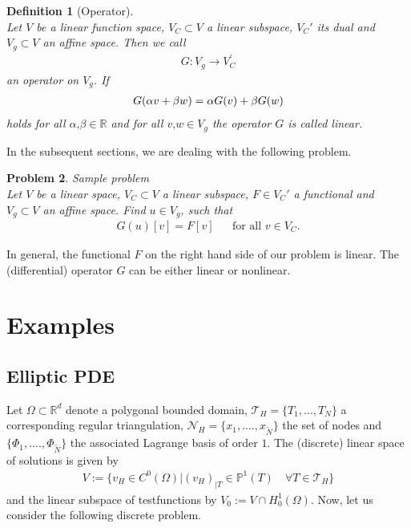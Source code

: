 \documentclass[a4paper,11pt]{article}
\numberwithin{equation}{section}
\newtheorem{definition}{Definition}[section]
\newtheorem{problem}[definition]{Problem}
\newcommand{\theoremNewline}{\hspace{1mm}\\}
\newcommand{\komma}{\text{,}}
\newcommand{\R}{\mathbb{R}}
\begin{document}
    \begin{definition}[Operator]\theoremNewline
      \label{definition::analytical_concept::operator}
      Let $V$ be a linear function space, ${V_C \subset V}$ a linear subspace, $V_C'$ its dual and ${V_g \subset V}$
      an affine space. Then we call
      \begin{align}
        G : V_g \rightarrow V^{\prime}_C
      \end{align}
      an \textnormal{operator} on $V_g$. If
      \begin{align}
        G(\alpha v + \beta w) = \alpha G(v) + \beta G(w)
          \notag
      \end{align}
      holds for all ${\alpha\komma \beta \in \R}$ and for all ${v\komma w \in V_g}$ the operator $G$ is called
      \textnormal{linear}.
    \end{definition}

    In the subsequent sections, we are dealing with the following problem.

    \begin{problem}{Sample problem}\theoremNewline
      \label{problem::analytical_concept::sample_problem}
      Let $V$ be a linear space, ${V_C \subset V}$ a linear subspace, ${F \in V_C'}$ a functional and
      ${V_g \subset V}$ an affine space. Find ${u \in V_g}$, such that
      \begin{align*}
        G(u)[v] = F[v] &&\text{for all } v \in V_C.
      \end{align*}
    \end{problem}

    In general, the functional $F$ on the right hand side of our problem is linear. The (differential) operator $G$
    can be either linear or nonlinear.

  \section{Examples}

    \subsection{Elliptic PDE}

      Let $\Omega \subset \mathbb{R}^d$ denote a polygonal bounded domain, $\mathcal{T}_H = \{ T_1, ..., T_N \}$ a
      corresponding regular triangulation, $\mathcal{N}_H = \{ x_1, ...., x_{\tilde{N}}\}$ the set of nodes and
      $\{ \Phi_1, ...., \Phi_{\tilde{N}}\}$ the associated Lagrange basis of order $1$. The (discrete) linear space of
      solutions is given by
      \begin{align*}
        V :=
          \Big\{
            v_H \in C^0(\Omega)
          \Big|
            (v_H)_{|T}\in \mathbb{P}^1(T) \quad\forall T \in \mathcal{T}_H
          \Big\}
      \end{align*}
      and the linear subspace of testfunctions by $V_0 := V \cap H^1_0(\Omega)$. Now, let us consider the
      following discrete problem.
\end{document}
